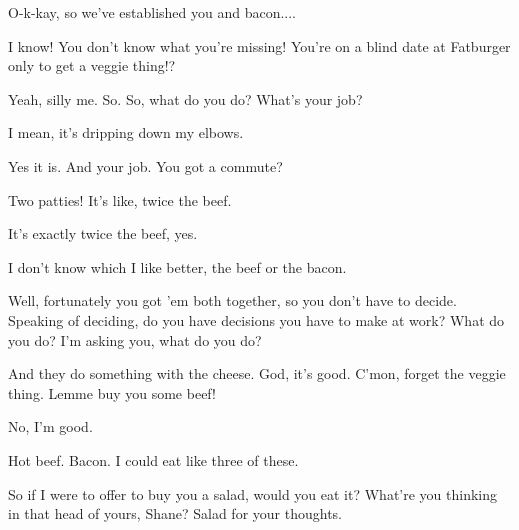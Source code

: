 \scene
{}

\ky
O-k-kay, so we’ve established you and bacon....

\sh
{}
I know! You don’t know what you’re missing! You’re on a blind date at Fatburger only to get a veggie thing!?

\ky
Yeah, silly me. So. So, what do you do? What’s your job?

\sh
I mean, it’s dripping down my elbows.


\ky
Yes it is. And your job. You got a commute?

\sh
Two patties! It's like, twice the beef.

\ky
It's exactly twice the beef, yes.

\sh
I don't know which I like better, the beef or the bacon.

\ky
Well, fortunately you got 'em both together, so you don't have to decide. Speaking of deciding, do you have decisions you have to make at work? What do you do? I'm asking you, what do you do?

\sh
And they do something with the cheese. God, it's good. C'mon, forget the veggie thing. Lemme buy you some beef!

\ky
No, I'm good.

\sh
Hot beef. Bacon. I could eat like three of these.





\ky
So if I were to offer to buy you a salad, would you eat it? What're you thinking in that head of yours, Shane? Salad for your thoughts.



